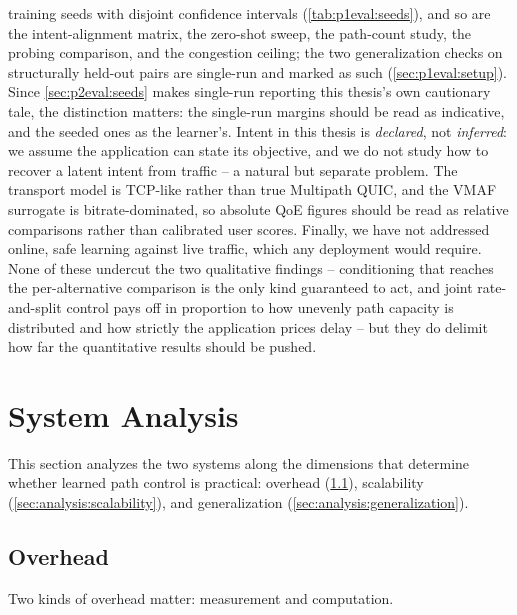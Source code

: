training seeds with disjoint confidence intervals (\cref{tab:p1eval:seeds}), and so are the
intent-alignment matrix, the zero-shot sweep, the path-count study, the probing comparison, and the
congestion ceiling; the two generalization checks on structurally held-out pairs are single-run and
marked as such (\cref{sec:p1eval:setup}). Since \cref{sec:p2eval:seeds} makes single-run reporting this
thesis's own cautionary tale, the distinction matters: the single-run margins should be read as
indicative, and the seeded ones as the learner's. Intent in this thesis is \emph{declared}, not
\emph{inferred}: we assume the application can state its objective, and we do not study how to recover a
latent intent from traffic -- a natural but separate problem. The transport model is TCP-like rather than true Multipath QUIC, and the VMAF surrogate is
bitrate-dominated, so absolute QoE figures should be read as relative comparisons rather than calibrated
user scores. Finally, we have not addressed online, safe learning against live traffic, which any
deployment would require. None of these undercut the two qualitative findings -- conditioning that reaches
the per-alternative comparison is the only kind guaranteed to act, and joint rate-and-split control pays
off in proportion to how unevenly path capacity is distributed and how strictly the application prices
delay -- but they do delimit how far the quantitative results should be pushed.

\section{System Analysis}
\label{sec:analysis}

This section analyzes the two systems along the dimensions that determine whether learned path control is
practical: overhead (\cref{sec:analysis:overhead}), scalability (\cref{sec:analysis:scalability}), and
generalization (\cref{sec:analysis:generalization}).

\subsection{Overhead}
\label{sec:analysis:overhead}

Two kinds of overhead matter: measurement and computation.

